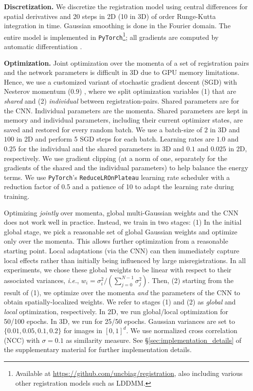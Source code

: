 \documentclass[10pt,twocolumn,letterpaper,table]{article}
\numberwithin{equation}{section}
\theoremstyle{plain}
\theoremstyle{definition}
\def\ie{\emph{i.e.}}  \def\Ie{\emph{I.e.}}
\begin{document}
\noindent
{\bf Discretization.} We discretize the registration model using central differences for spatial derivatives and 20 steps in 2D (10 in 3D) of  order Runge-Kutta integration in time. Gaussian smoothing is done in the Fourier domain. The entire model is implemented in \texttt{PyTorch}\footnote{Available at \url{https://github.com/uncbiag/registration}, also including various other registration models such as LDDMM.}; all gradients are computed by automatic differentiation \cite{Paszke17a}.

\noindent
    {\bf Optimization.} Joint optimization over the momenta of a set of registration pairs and the network parameters is difficult in 3D due to GPU memory limitations. Hence, we use a customized variant of stochastic gradient descent (SGD) with Nesterov momentum ($0.9$) \cite{Sutskever13a}, where we split optimization variables (1) that are {\it shared} and (2) {\it individual} between registration-pairs. Shared parameters are for the CNN. Individual parameters are the momenta. Shared parameters are kept in memory and individual parameters, including their current optimizer states, are saved and restored for every random batch. We use a batch-size of $2$ in 3D and $100$ in 2D and perform 5 SGD steps for each batch. 
    Learning rates are $1.0$ and $0.25$ for the individual and the shared parameters in 3D and $0.1$ and $0.025$ in 2D, respectively. We use gradient clipping (at a norm of one, separately for the gradients of the shared and the individual parameters) to help balance the energy terms. We use \texttt{PyTorch}'s {\tt ReduceLROnPlateau} learning rate scheduler with a reduction factor of 0.5 and a patience of 10 to adapt the learning rate during training. 

     Optimizing \emph{jointly} over momenta, global multi-Gaussian weights and the CNN does not work well in practice. Instead, we train in two stages: (1) In the initial global stage, we pick a reasonable set of global Gaussian weights and optimize only over the momenta. This allows further optimization from a reasonable starting point. Local adaptations (via the CNN) can then immediately capture local effects rather than initially being influenced by large misregistrations. In all  experiments, we chose these global weights to be linear with respect to their associated variances, \ie, $w_i = \sigma_i^2/(\sum_{j=0}^{N-1}\sigma_j^2)$. Then, (2) starting from the result of (1), we optimize over the momenta \emph{and} the parameters of the CNN to obtain spatially-localized weights. We refer to stages (1) and (2) as \emph{global} and \emph{local} optimization, respectively. 
      In 2D, we run global/local optimization for 50/100 epochs. In 3D, we run for 25/50 epochs. Gaussian variances are set to $\{0.01,0.05,0.1,0.2\}$ for images in $[0,1]^d$. We use normalized cross correlation (NCC) with $\sigma=0.1$ as similarity measure. See \S\ref{sec:implementation_details} of the supplementary material for further implementation details.
\vspace{-0.1cm}
\end{document}
